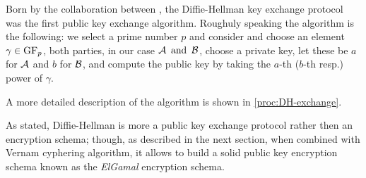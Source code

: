 \documentclass{subfiles}
\begin{document}
\label{sec:diffie-hellman}
    Born by the collaboration between \citeauthor{DiffieH1976}, 
        the Diffie-Hellman key exchange protocol was the first public key exchange algorithm.
        Roughuly speaking the algorithm is the following: 
        we select a prime number \(p\) and consider and choose an element \(\gamma \in \operatorname{GF}_{p}\),
        both parties, in our case \(\operatorname{\mathcal{A}} \text{ and } \operatorname{\mathcal{B}}\), 
        choose a private key, let these be \(a\) for \(\operatorname{\mathcal{A}}\) and \(b\) for \(\operatorname{\mathcal{B}}\),
        and compute the public key by taking the \(a\)-th (\(b\)-th resp.) power of \(\gamma\).

    A more detailed description of the algorithm is shown in \autoref{proc:DH-exchange}.
        

    As stated, Diffie-Hellman is more a public key exchange protocol rather then an encryption schema;
        though, as described in the next section, when combined with Vernam cyphering algorithm,
        it allows to build a solid public key encryption schema known as the \emph{ElGamal} encryption
        schema.
\end{document}
